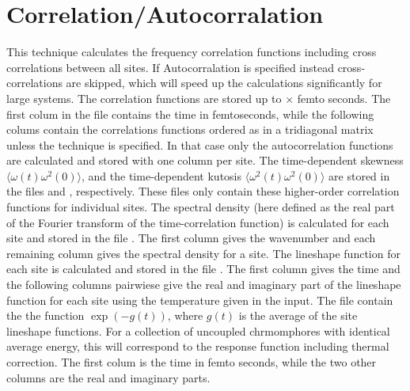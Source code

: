 \section{Correlation/Autocorralation}
This technique calculates the frequency correlation functions including cross correlations between all sites.
If Autocorralation is specified instead cross-correlations are skipped, which will speed up the calculations significantly for large systems.
The correlation functions are stored up to $\times$ femto seconds.
The first colum in the file  contains the time in femtoseconds,
while the following colums contain the correlations functions ordered as in a tridiagonal matrix unless the technique  is specified.
In that case only the autocorrelation functions are calculated and stored with one column per site.
The time-dependent skewness $\langle \omega(t)\omega^2(0) \rangle$, and the time-dependent kutosis $\langle \omega^2(t)\omega^2(0) \rangle$ are stored in the files  and , respectively.
These files only contain these higher-order correlation functions for individual sites.
The spectral density (here defined as the real part of the Fourier transform of the time-correlation function) is calculated for each site and stored in the file .
The first column gives the wavenumber and each remaining column gives the spectral density for a site.
The lineshape function for each site is calculated and stored in the file .
The first column gives the time and the following columns pairwiese give the real and imaginary part of the lineshape function for each site using the temperature given in the input.
The file  contain the the function $\exp(-g(t))$, where $g(t)$ is the average of the site lineshape functions.
For a collection of uncoupled chrmomphores with identical average energy, this will correspond to the response function including thermal correction.
The first colum is the time in femto seconds, while the two other columns are the real and imaginary parts.

